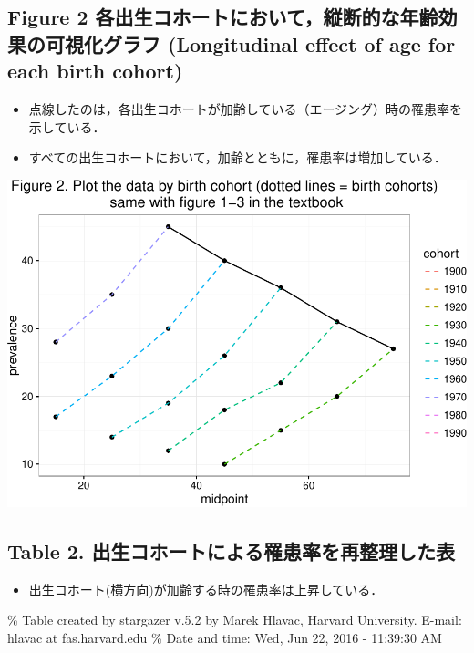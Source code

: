 \documentclass[11pt,]{article}
\providecommand{\tightlist}{%
  \setlength{\itemsep}{0pt}\setlength{\parskip}{0pt}}
\begin{document}
\subsection{Figure 2
各出生コホートにおいて，縦断的な年齢効果の可視化グラフ (Longitudinal
effect of age for each birth
cohort)}\label{figure-2--longitudinal-effect-of-age-for-each-birth-cohort}

\begin{itemize}
\tightlist
\item
  点線したのは，各出生コホートが加齢している（エージング）時の罹患率を示している．\\
\item
  すべての出生コホートにおいて，加齢とともに，罹患率は増加している．
\end{itemize}

\includegraphics{guidance_files/figure-latex/unnamed-chunk-4-1.pdf}

\subsection{Table 2.
出生コホートによる罹患率を再整理した表}\label{table-2.-}

\begin{itemize}
\tightlist
\item
  出生コホート(横方向)が加齢する時の罹患率は上昇している．
\end{itemize}

\% Table created by stargazer v.5.2 by Marek Hlavac, Harvard University.
E-mail: hlavac at fas.harvard.edu \% Date and time: Wed, Jun 22, 2016 -
11:39:30 AM
\end{document}
